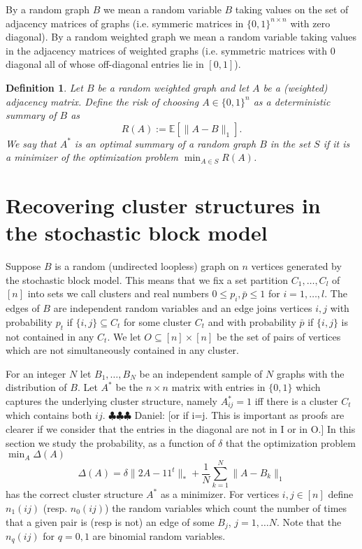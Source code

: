 \documentclass[12pt]{amsart}
\newtheorem{definition}[lemma]{Definition}
\theoremstyle{remark}
\newcommand{\EE}{\mathbb{E}}
\newcommand{\ddr}[1]{{\color{blue} \sf $\clubsuit\clubsuit\clubsuit$ Daniel: [#1]}}
\begin{document}
By a random graph $B$ we mean a random variable $B$ taking values on the set of adjacency matrices of graphs (i.e. symmeric matrices in $\{0,1\}^{n\times n}$ with zero diagonal). By a random weighted graph we mean a random variable taking values in the adjacency matrices of weighted graphs (i.e. symmetric matrices with $0$ diagonal all of whose off-diagonal entries lie in $[0,1]$). 

\begin{definition} Let $B$ be a random weighted graph and let $A$ be a (weighted) adjacency matrix. Define the risk of choosing $A\in \{0,1\}^n$ as a deterministic summary of $B$ as
\[R(A):=\EE[\|A-B\|_1].\]
We say that $A^*$ is an optimal summary of a random graph $B$ in the set $S$ if it is a minimizer of the optimization problem $\min_{A\in S} R(A)$.
\end{definition}


\section{Recovering cluster structures in the stochastic block model}

Suppose $B$ is a random (undirected loopless) graph on $n$ vertices generated by the stochastic block model. This means that we fix a set partition $C_1,\dots, C_l$ of $[n]$ into sets we call clusters and real numbers $0\leq p_i,\bar{p}\leq 1$ for $i=1,\dots, l$. The edges of $B$ are independent random variables and an edge joins vertices $i,j$ with probability $p_t$ if $\{i,j\}\subseteq C_t$ for some cluster $C_t$ and with probability $\bar{p}$ if $\{i,j\}$ is not contained in any $C_t$. We let $O\subseteq [n]\times [n]$ be the set of pairs of vertices which are not simultaneously contained in any cluster. 

For an integer $N$ let $B_1,\dots, B_N$ be an independent sample of $N$ graphs with the distribution of $B$. Let $A^*$ be the $n\times n$ matrix with entries in $\{0,1\}$ which captures the underlying cluster structure, namely $A^*_{ij}=1$ iff there is a cluster $C_t$ which contains both $ij$.
\ddr{or if i=j. This is important as proofs are clearer if we consider that the entries in the diagonal are not in I or in O.}
In this section we study the probability, as a function of $\delta$ that the optimization problem $\min_A\Delta(A)$
\[\Delta(A)= \delta\|2A-11^t\|_{*}+\frac{1}{N}\sum_{k=1}^N\|A-B_k\|_1\] 
has the correct cluster structure $A^*$ as a minimizer. For vertices $i,j\in [n]$ define $n_1(ij)$ (resp. $n_0(ij)$) the random variables which count the number of times that a given pair is (resp is not) an edge of some $B_j$, $j=1,\dots N$. Note that the $n_q(ij)$ for $q=0,1$ are binomial random variables.  
\end{document}
